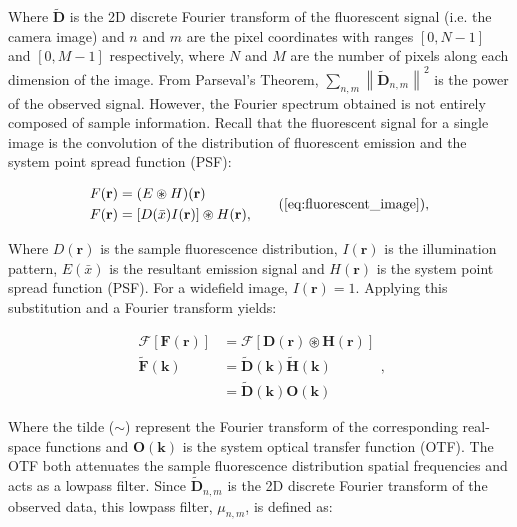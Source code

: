 Where $\tilde{\textbf{D}}$ is the 2D discrete Fourier transform of 
the fluorescent signal (i.e. the camera image) and $n$ and 
$m$ are the pixel coordinates with ranges $[0, N-1]$ and $[0, M-1]$ 
respectively, where $N$ and $M$ are the number of pixels along each 
dimension of the image. From Parseval's Theorem, $\sum\limits_{n,m}
\left\| \tilde{\textbf{D}}_{n,m} \right\|^2$ is the power of the 
observed signal. However, the Fourier spectrum obtained is not 
entirely composed of sample information. Recall that the fluorescent 
signal for a single image is the convolution of the distribution of 
fluorescent emission and the system point spread function (PSF):

\begin{equation}
\begin{split}
F(\textbf{r}) &= (E \circledast H)(\textbf{r})\\
F(\textbf{r}) &= [D(\bar{x})I(\textbf{r})] \circledast H(\textbf{r}),\\
\end{split}\tag{\ref{eq:fluorescent_image}},
\end{equation}

Where $D(\textbf{r})$ is the sample fluorescence distribution, 
$I(\textbf{r})$ is the illumination pattern, $E(\bar{x})$ is
the resultant emission signal and $H(\textbf{r})$ is the system 
point spread function (PSF). For a widefield image, 
$I(\textbf{r}) = 1$. Applying this substitution and a Fourier 
transform yields:

\begin{equation}\label{eq:fluor_signal_fourier}
\begin{split}
\mathcal{F}[\textbf{F}(\textbf{r})] &= \mathcal{F}[\textbf{D}(\textbf{r}) \circledast \textbf{H}(\textbf{r})]\\
\tilde{\textbf{F}}(\textbf{k}) &= \tilde{\textbf{D}}(\textbf{k}) \tilde{\textbf{H}}(\textbf{k})\\
&= \tilde{\textbf{D}}(\textbf{k}) \textbf{O}(\textbf{k})		
\end{split},
\end{equation}

Where the tilde ($\sim$) represent the Fourier transform of the corresponding 
real-space functions and $\textbf{O}(\textbf{k})$ is the system optical transfer 
function (OTF)\cite{gustafsson2008three}. The OTF both attenuates the sample 
fluorescence distribution spatial frequencies and acts as a lowpass filter. 
Since $\tilde{\textbf{D}}_{n,m}$ is the 2D discrete Fourier transform of 
the observed data, this lowpass filter, $\mu_{n,m}$, is defined as:

